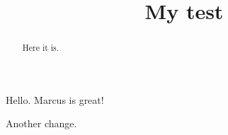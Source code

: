 \documentclass{ximera}
\title{My test}
\begin{document}
\begin{abstract}
  Here it is.
\end{abstract}
\maketitle

Hello. Marcus is great!

Another change.
\end{document}
